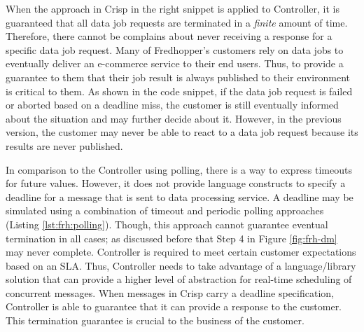 When the approach in Crisp in the right snippet is applied to Controller, it is guaranteed that all data job requests are terminated in a \emph{finite} amount of time.
Therefore, there cannot be complains about never receiving a response for a specific data job request.
Many of Fredhopper's customers rely on data jobs to eventually deliver an e-commerce service to their end users.
Thus, to provide a guarantee to them that their job result is always published to their environment is critical to them.
As shown in the code snippet, if the data job request is failed or aborted based on a deadline miss, 
the customer is still eventually informed about the situation and may further decide about it.
However, in the previous version, the customer may never be able to react to a data job request because its results are never published.

In comparison to the Controller using polling, there is a way to express timeouts for future values.
However, it does not provide language constructs to specify a deadline for a message that is sent to data processing service.
A deadline may be simulated using a combination of timeout and periodic polling approaches (Listing \ref{lst:frh:polling}).
Though, this approach cannot guarantee eventual termination in all cases; as discussed before that Step 4 in Figure \ref{fig:frh-dm} may never complete.
Controller is required to meet certain customer expectations based on an SLA.
Thus, Controller needs to take advantage of a language/library solution that can provide a higher level of abstraction for real-time scheduling of concurrent messages.
When messages in Crisp carry a deadline specification, Controller is able to guarantee that it can provide a response to the customer.
This termination guarantee is crucial to the business of the customer.

